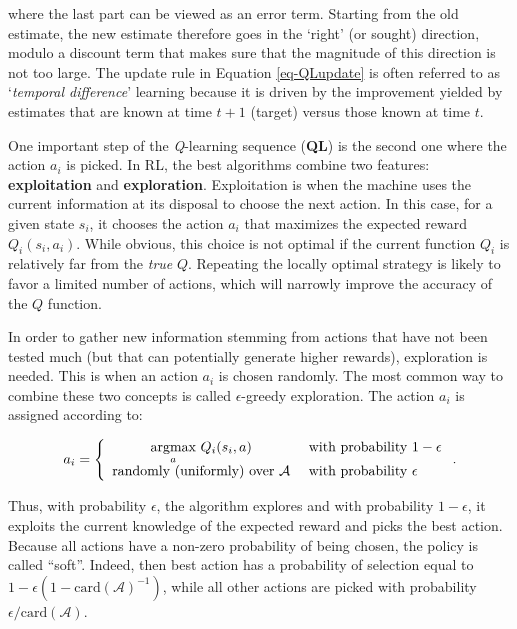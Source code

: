 where the last part can be viewed as an error term. Starting from the old estimate, the new estimate therefore goes in the `right' (or sought) direction, modulo a discount term that makes sure that the magnitude of this direction is not too large. The update rule in Equation \ref{eq-QLupdate} is often referred to as `\textit{temporal difference}' learning because it is driven by the improvement yielded by estimates that are known at time $t+1$ (target) versus those known at time $t$.

One important step of the \textit{Q}-learning sequence (\textbf{QL}) is the second one where the action $a_i$ is picked. In RL, the best algorithms combine two features: \textbf{exploitation} and \textbf{exploration}. Exploitation is when the machine uses the current information at its disposal to choose the next action. In this case, for a given state $s_i$, it chooses the action $a_i$ that maximizes the expected reward $Q_i(s_i,a_i)$. While obvious, this choice is not optimal if the current function $Q_i$ is relatively far from the \textit{true} $Q$. Repeating the locally optimal strategy is likely to favor a limited number of actions, which will narrowly improve the accuracy of the $Q$ function.

In order to gather new information stemming from actions that have not been tested much (but that can potentially generate higher rewards), exploration is needed. This is when an action $a_i$ is chosen randomly. The most common way to combine these two concepts is called $\epsilon$-greedy exploration. The action $a_i$ is assigned according to:

\begin{equation}
\label{eq-egreedy}
a_i=\left\{ \begin{array}{c l}
\underset{a}{\text{argmax}} \ Q_i(s_i,a) & \text{ with probability } 1-\epsilon \\
\text{randomly (uniformly) over } \mathcal{A} & \text{ with probability } \epsilon
\end{array}\right. .
\end{equation}

Thus, with probability $\epsilon$, the algorithm explores and with probability $1 -\epsilon$, it exploits the current knowledge of the expected reward and picks the best action. Because all actions have a non-zero probability of being chosen, the policy is called ``soft''. Indeed, then best action has a probability of selection equal to $1 -\epsilon(1 -\text{card}(\mathcal{A})^{ -1})$, while all other actions are picked with probability $\epsilon/\text{card}(\mathcal{A})$.

